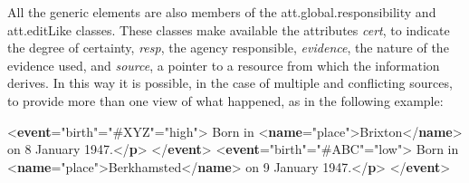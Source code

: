 All the generic elements are also members of the \textsf{att.global.responsibility} and \textsf{att.editLike} classes. These classes make available the attributes {\itshape cert}, to indicate the degree of certainty, {\itshape resp}, the agency responsible, {\itshape evidence}, the nature of the evidence used, and {\itshape source}, a pointer to a resource from which the information derives. In this way it is possible, in the case of multiple and conflicting sources, to provide more than one view of what happened, as in the following example: \par\bgroup{}\exampleFont \begin{shaded}\noindent\mbox{}{<\textbf{event}\hspace*{1em}{type}="{birth}"\hspace*{1em}{resp}="{\#XYZ}"\hspace*{1em}{cert}="{high}">}\mbox{}\newline 
{}Born in {<\textbf{name}\hspace*{1em}{type}="{place}">}Brixton{</\textbf{name}>} on 8 January\mbox{}\newline 
\hspace*{1em}\hspace*{1em} 1947.{</\textbf{p}>}\mbox{}\newline 
{</\textbf{event}>}\mbox{}\newline 
{<\textbf{event}\hspace*{1em}{type}="{birth}"\hspace*{1em}{resp}="{\#ABC}"\hspace*{1em}{cert}="{low}">}\mbox{}\newline 
{}Born in {<\textbf{name}\hspace*{1em}{type}="{place}">}Berkhamsted{</\textbf{name}>} on 9 January\mbox{}\newline 
\hspace*{1em}\hspace*{1em} 1947.{</\textbf{p}>}\mbox{}\newline 
{</\textbf{event}>}\end{shaded}\egroup\par 
